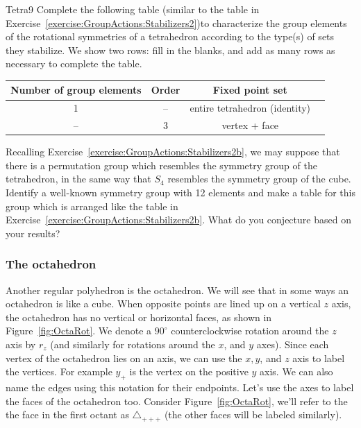 \begin{exercise}{Tetra9}
Complete the following table (similar to the table in Exercise~\ref{exercise:GroupActions:Stabilizers2})to characterize the group elements of the rotational symmetries of a tetrahedron according to the type(s) of sets they stabilize.  We show two rows: fill in the blanks, and add as many rows as necessary to complete the table.
  
\begin{tabular}{| c |c|c| r |} \hline
 \textbf{ Number of group elements} & \textbf{Order} & \textbf{Fixed point set} \\ \hline
  1&  --& entire tetrahedron (identity) \\ \hline
  -- & 3& vertex + face \\   
\end{tabular}

\end{exercise}
\begin{exercise}{}
Recalling Exercise~\ref{exercise:GroupActions:Stabilizers2b}, we may suppose that there is a permutation group which resembles the symmetry group of the tetrahedron, in the same way that $S_4$ resembles the symmetry group of the cube. Identify a well-known symmetry group with 12 elements and  make a table for this group which is arranged like the table in Exercise~\ref{exercise:GroupActions:Stabilizers2b}. What do you conjecture based on your results?
\end{exercise}
\subsubsection*{The octahedron}
Another regular polyhedron is the octahedron.  We will see that in some ways an octahedron is like a cube. 
When opposite points are lined up  on a vertical $z$ axis, the octahedron has no vertical or horizontal faces, as shown in Figure~\ref{fig:OctaRot}.  We denote a  $90^{\circ}$ counterclockwise rotation around the $z$ axis by $r_z$ (and similarly for rotations around the $x$, and $y$ axes).
Since each vertex of the octahedron lies on an axis, we can use the $x,y$, and $z$ axis to label the vertices.  For example $y_+$ is the vertex on the positive $y$ axis.   We can also name the edges using this notation for their endpoints.   Let's use the axes to label the faces of the octahedron too.  Consider Figure~\ref{fig:OctaRot}, we'll refer to the the face in the first octant as $\triangle_{ +++}$ (the other faces will be labeled similarly).

